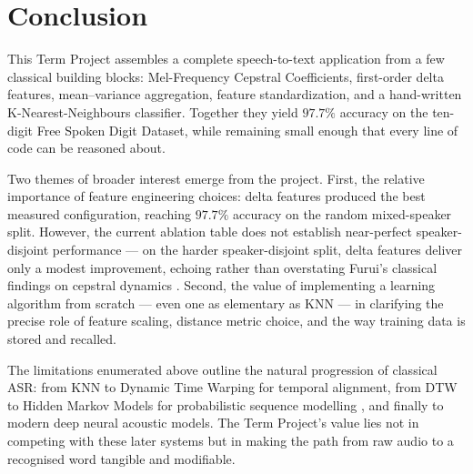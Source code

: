 \documentclass[12pt,a4paper]{article}
\begin{document}
\section{Conclusion}

This Term Project assembles a complete speech-to-text application from a few
classical building blocks: Mel-Frequency Cepstral Coefficients, first-order
delta features, mean--variance aggregation, feature standardization, and a
hand-written K-Nearest-Neighbours classifier. Together they yield $97.7\%$
accuracy on the ten-digit Free Spoken Digit Dataset, while remaining small
enough that every line of code can be reasoned about.

Two themes of broader interest emerge from the project. First, the
relative importance of feature engineering choices: delta features produced
the best measured configuration, reaching $97.7\%$ accuracy on the random
mixed-speaker split. However, the current ablation table does not establish
near-perfect speaker-disjoint performance --- on the harder speaker-disjoint
split, delta features deliver only a modest improvement, echoing rather than
overstating Furui's classical findings on cepstral dynamics
\cite{furui1986speaker}. Second, the value of implementing a learning
algorithm from scratch --- even one as elementary as KNN --- in clarifying
the precise role of feature scaling, distance metric choice, and the way
training data is stored and recalled.

The limitations enumerated above outline the natural progression of
classical ASR: from KNN to Dynamic Time Warping for temporal alignment, from
DTW to Hidden Markov Models for probabilistic sequence modelling
\cite{rabiner1993fundamentals}, and finally to modern deep neural
acoustic models. The Term Project's value lies not in competing with these
later systems but in making the path from raw audio to a recognised word
tangible and modifiable.



\end{document}
